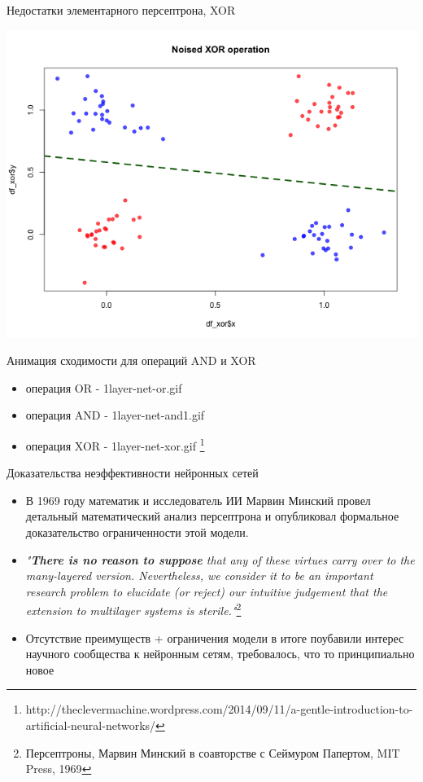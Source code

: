 \documentclass[10pt]{beamer}
\begin{document}
\begin{frame}{Недостатки элементарного персептрона, XOR}

\centering
\includegraphics[width=1\textwidth]{images/leakage_perceptron_xor.png}

\end{frame}


\begin{frame}{Анимация сходимости для операций AND и XOR}

\begin{itemize}
	\item операция OR  - 1layer-net-or.gif
	\item операция AND - 1layer-net-and1.gif
	\item операция XOR - 1layer-net-xor.gif \footnote{http://theclevermachine.wordpress.com/2014/09/11/a-gentle-introduction-to-artificial-neural-networks/}
\end{itemize}

\end{frame}


\begin{frame}{Доказательства неэффективности нейронных сетей}

\begin{itemize}
	\item В 1969 году математик и исследователь ИИ Марвин Минский провел детальный математический анализ  персептрона и опубликовал формальное доказательство ограниченности этой модели.
	\item \textit{"\textbf{There is no reason to suppose} that any of these virtues carry over to the many-layered version. Nevertheless, we consider it to be an important research problem to elucidate (or reject) our intuitive judgement that the extension to multilayer systems is sterile."}\footnote{Персептроны, Марвин Минский в соавторстве с Сеймуром Папертом, MIT Press, 1969}
	\item Отсутствие преимуществ + ограничения модели в итоге поубавили интерес научного сообщества к нейронным сетям, требовалось, что то принципиально новое
\end{itemize}

\end{frame}
\end{document}
